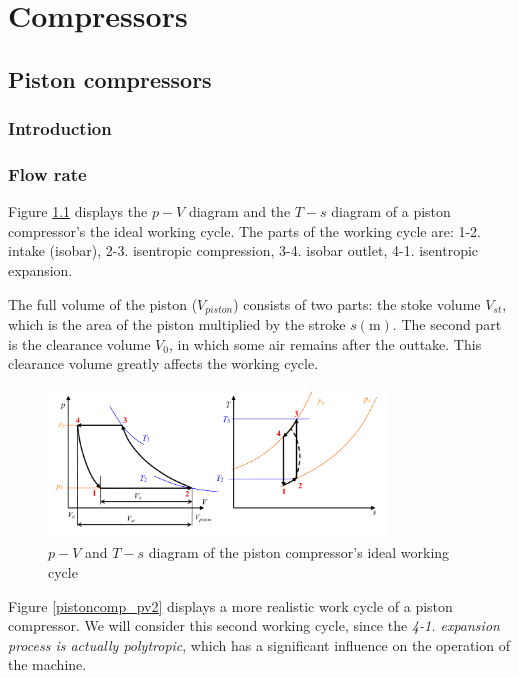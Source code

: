 \chapter{Compressors}

\section{Piston compressors}

\subsection{Introduction}

\subsection{Flow rate}

Figure \ref{pistoncomp_pvTS} displays the $p-V$ diagram and the $T-s$ diagram of a piston compressor's the ideal working cycle. The parts of the working cycle are: 1-2. intake (isobar), 2-3. isentropic compression, 3-4. isobar outlet, 4-1. isentropic expansion. 

The full volume of the piston ($V_{piston}$) consists of two parts: the stoke volume $V_{st}$, which is the area of the piston multiplied by the stroke $s (\mathrm{m})$. The second part is the clearance volume $V_0$, in which some air remains after the outtake. This clearance volume greatly affects the working cycle. 

\begin{figure}[!h]
\begin{center}
\includegraphics[width=0.8\textwidth]{figs/pistoncomp_pV_Ts_en.png}
\caption{\label{pistoncomp_pvTS} $p-V$ and $T-s$ diagram of the piston compressor's ideal working cycle}
\end{center}
\end{figure}

Figure \ref{pistoncomp_pv2} displays a more realistic work cycle of a piston compressor. We will consider this second working cycle, since the \emph{4-1. expansion process is actually polytropic}, which has a significant influence on the operation of the machine. 

